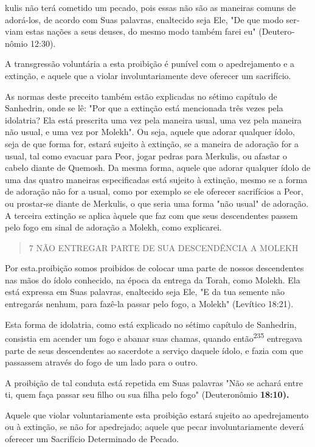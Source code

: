 kulis não terá cometido um pecado, pois essas não são as maneiras comuns
de adorá-los, de acordo com Suas palavras, enaltecido seja Ele, "De que
modo ser­viam estas nações a seus deuses, do mesmo modo também farei eu"
(Deutero­nômio 12:30).

A transgressão voluntária a esta proibição é punível com o
apedreja­mento e a extinção, e aquele que a violar involuntariamente
deve oferecer um sacrifício.

As normas deste preceito também estão explicadas no sétimo capí­tulo de
Sanhedrin, onde se lê: "Por que a extinção está mencionada três vezes
pela idolatria? Ela está prescrita uma vez pela maneira usual, uma vez
pela ma­neira não usual, e uma vez por Molekh". Ou seja, aquele que
adorar qualquer ídolo, seja de que forma for, estará sujeito à extinção,
se a maneira de adoração for a usual, tal como evacuar para Peor, jogar
pedras para Merkulis, ou afastar o cabelo diante de Quemosh. Da mesma
forma, aquele que adorar qualquer ídolo de uma das quatro maneiras
especificadas está sujeito à extinção, mesmo se a forma de adoração não
for a usual, como por exemplo se ele oferecer sacri­fícios a Peor, ou
prostar-se diante de Merkulis, o que seria uma forma "não usual" de
adoração. A terceira extinção se aplica àquele que faz com que seus
descen­dentes passem pelo fogo em sinal de adoração a Molekh, como
explicarei.

\begin{quote}
7 NÃO ENTREGAR PARTE DE SUA DESCENDÊNCIA A MOLEKH
\end{quote}

Por esta.proibição somos proibidos de colocar uma parte de nossos
descendentes nas mãos do ídolo conhecido, na época da entrega da Torah,
co­mo Molekh. Ela está expressa em Suas palavras, enaltecido seja Ele,
"E da tua semente não entregarás nenhum, para fazê-la passar pelo fogo,
a Molekh" (Le­vítico 18:21).

Esta forma de idolatria, como está explicado no sétimo capítulo de
Sanhedrin, consistia em acender um fogo e abanar suas chamas, quando
então\textsuperscript{235} entregava parte de seus descendentes ao
sacerdote a serviço daquele ídolo, e fazia com que passassem através do
fogo de um lado para o outro.

A proibição de tal conduta está repetida em Suas palavras "Não se achará
entre ti, quem faça passar seu filho ou sua filha pelo fogo"
(Deuteronô­mio \textbf{18:10).}

Aquele que violar voluntariamente esta proibição estará sujeito ao
apedrejamento ou à extinção, se não for apedrejado; aquele que pecar
involun­tariamente deverá oferecer um Sacrifício Determinado de Pecado.


